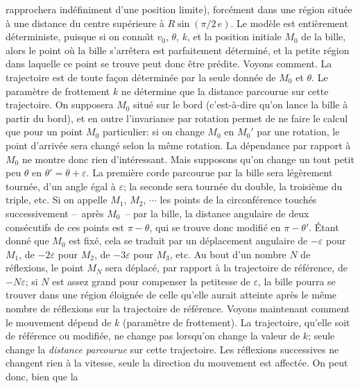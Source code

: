 rapprochera ind\'efiniment d'une position limite), forc\'ement dans une  
r\'egion situ\'ee \`a une distance du centre sup\'erieure \`a  
$R\sin (\pi / 2\, e)$. Le mod\`ele est enti\`erement d\'eterministe, 
puisque si  on conna\^\i t $v_0$, $\theta$, $k$, et la position initiale 
$M_0$ de la bille, alors le point o\`u la bille s'arr\^etera est parfaitement 
d\'etermin\'e, et la petite r\'egion dans laquelle ce point se trouve peut 
donc \^etre pr\'edite. Voyons comment.  
\medskip 
La trajectoire est de toute fa\c con d\'etermin\'ee par la seule donn\'ee  
de  $M_0$ et $\theta$. Le param\`etre de frottement $k$ ne d\'etermine  
que la distance parcourue sur cette trajectoire. On supposera $M_0$ 
situ\'e sur le bord (c'est-\`a-dire qu'on lance la bille \`a partir du bord),  
et en outre l'invariance par rotation permet de ne faire le calcul que pour 
un point $M_0$ particulier: si on change $M_0$ en $M_0'$ par une rotation, 
le point d'arriv\'ee sera chang\'e selon la m\^eme rotation. La  
d\'ependance par rapport \`a $M_0$ ne montre donc rien d'int\'eressant. 
Mais supposons qu'on change un tout petit peu $\theta$ en $\theta' = 
\theta + \varepsilon$. La premi\`ere corde parcourue par la bille sera 
l\'eg\`erement tourn\'ee, d'un angle \'egal  \`a  $\varepsilon$; la seconde 
sera tourn\'ee du double, la troisi\`eme  du triple, etc. Si on appelle 
$M_1$, $M_2$, $\cdots$ les points de la circonf\'erence touch\'es 
successivement --~apr\`es $M_0$~-- par la  bille, la distance angulaire 
de deux cons\'ecutifs de ces points est $\pi  - \theta$, qui se trouve donc 
modifi\'e en $\pi - \theta'$. \'Etant donn\'e que $M_0$ est fix\'e, cela  
se traduit par un d\'eplacement angulaire de  $-\varepsilon$ pour $M_1$, 
de $-2\varepsilon$ pour $M_2$, de $-3\varepsilon$ pour $M_3$, etc. Au 
bout d'un nombre $N$ de r\'eflexions, le point $M_N$ sera d\'eplac\'e, par 
rapport \`a la  trajectoire de r\'ef\'erence, de $-N\varepsilon$; si $N$ est 
assez grand pour compenser la petitesse de $\varepsilon$, la bille pourra 
se trouver  dans une r\'egion \'eloign\'ee de celle qu'elle aurait atteinte 
apr\`es le  m\^eme nombre de r\'eflexions sur la trajectoire de 
r\'ef\'erence.  
\medskip 
Voyons maintenant comment le mouvement d\'epend de $k$ (param\`etre  
de frottement). La trajectoire, qu'elle soit de r\'ef\'erence ou 
modifi\'ee,  ne change pas lorsqu'on change la valeur de $k$; seule 
change la {\it distance parcourue} sur cette trajectoire. Les 
r\'eflexions successives ne changent rien \`a la vitesse, seule la 
direction du mouvement est affect\'ee. On peut donc, bien que la 
